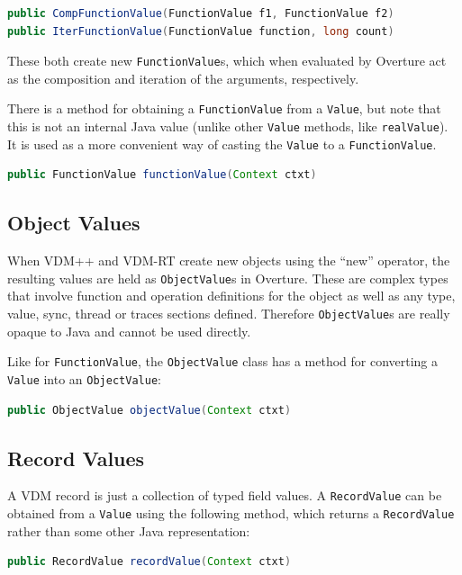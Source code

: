 \documentclass{overturerepchap}
\newcommand{\kw}[1]{{\textbf\ttfamily #1}}
\begin{document}
\begin{lstlisting}[language=JAVA]
public CompFunctionValue(FunctionValue f1, FunctionValue f2)
public IterFunctionValue(FunctionValue function, long count)
\end{lstlisting}

These both create new \texttt{FunctionValue}s, which when evaluated by Overture act as the composition and iteration of the arguments, respectively.

There is a method for obtaining a \texttt{FunctionValue} from a \texttt{Value}, but note that this is not an internal Java value (unlike other \texttt{Value} methods, like \texttt{realValue}). It is used as a more convenient way of casting the \texttt{Value} to a \texttt{FunctionValue}.

\begin{lstlisting}[language=JAVA]
public FunctionValue functionValue(Context ctxt)
\end{lstlisting}

\subsection{Object Values}

When VDM++ and VDM-RT create new objects using the ``\kw{new}'' operator, the resulting values are held as \texttt{ObjectValue}s in Overture. These are complex types that involve function and operation definitions for the object as well as any type, value, sync, thread or traces sections defined. Therefore \texttt{ObjectValue}s are really opaque to Java and cannot be used directly.

Like for \texttt{FunctionValue}, the \texttt{ObjectValue} class has a method for converting a \texttt{Value} into an \texttt{ObjectValue}:

\begin{lstlisting}[language=JAVA]
public ObjectValue objectValue(Context ctxt)
\end{lstlisting}

\subsection{Record Values}

A VDM record is just a collection of typed field values. A \texttt{RecordValue} can be obtained from a \texttt{Value} using the following method, which returns a \texttt{RecordValue} rather than some other Java representation:

\begin{lstlisting}[language=JAVA]
public RecordValue recordValue(Context ctxt)
\end{lstlisting}
\end{document}
